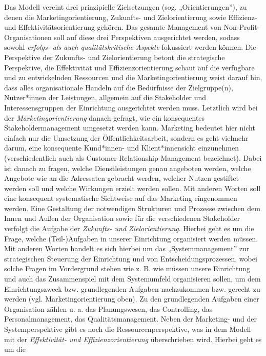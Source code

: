 \documentclass[
  letterpaper,
]{book}
\begin{document}
Das Modell vereint drei prinzipielle Zielsetzungen (sog.
„Orientierungen''), zu denen die Marketingorientierung, Zukunfts- und
Zielorientierung sowie Effizienz- und Effektivitätsorientierung gehören.
Das gesamte Management von Non-Profit-Organisationen soll auf diese drei
Perspektiven ausgerichtet werden, sodass sowohl \emph{erfolgs- als auch
qualitätskritische Aspekte} fokussiert werden können. Die Perspektive
der Zukunfts- und Zielorientierung betont die strategische Perspektive,
die Effektivität und Effizienzorientierung schaut auf die verfügbare und
zu entwickelnden Ressourcen und die Marketingorientierung weist darauf
hin, dass alles organisationale Handeln auf die Bedürfnisse der
Zielgruppe(n), Nutzer*innen der Leistungen, allgemein auf die
Stakeholder und Interessensgruppen der Einrichtung ausgerichtet werden
muss. Letztlich wird bei der \emph{Marketingorientierung} danach
gefragt, wie ein konsequentes Stakeholdermanagement umgesetzt werden
kann. Marketing bedeutet hier nicht einfach nur die Umsetzung der
Öffentlichkeitsarbeit, sondern es geht vielmehr darum, eine konsequente
Kund*innen- und Klient*innensicht einzunehmen (verschiedentlich auch als
Customer-Relationship-Management bezeichnet). Dabei ist danach zu
fragen, welche Dienstleistungen genau angeboten werden, welche Angebote
wie an die Adressaten gebracht werden, welcher Nutzen gestiftet werden
soll und welche Wirkungen erzielt werden sollen. Mit anderen Worten soll
eine konsequent systematische Sichtweise auf das Marketing eingenommen
werden. Eine Gestaltung der notwendigen Strukturen und Prozesse zwischen
dem Innen und Außen der Organisation sowie für die verschiedenen
Stakeholder verfolgt die Aufgabe der \emph{Zukunfts- und
Zielorientierung}. Hierbei geht es um die Frage, welche (Teil-)Aufgaben
in unserer Einrichtung organisiert werden müssen. Mit anderen Worten
handelt es sich hierbei um das „Systemmanagement'' zur strategischen
Steuerung der Einrichtung und von Entscheidungsprozessen, wobei solche
Fragen im Vordergrund stehen wie z. B. wie müssen unsere Einrichtung und
auch das Zusammenspiel mit dem Systemumfeld organisieren sollen, um dem
Einrichtungszweck bzw. grundlegenden Aufgaben nachzukommen bzw. gerecht
zu werden (vgl. Marketingorientierung oben). Zu den grundlegenden
Aufgaben einer Organisation zählen u. a. das Planungswesen, das
Controlling, das Personalmanagement, das Qualitätsmanagement. Neben der
Marketing- und der Systemperspektive gibt es noch die
Ressourcenperspektive, was in dem Modell mit der \emph{Effektivität- und
Effizienzorientierung} überschrieben wird. Hierbei geht es um die
\end{document}
